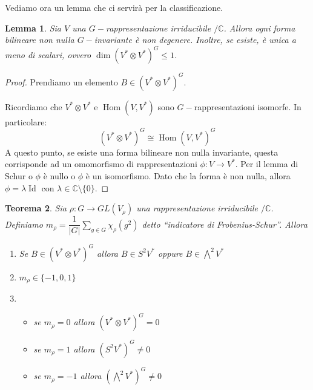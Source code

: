 \documentclass[11pt]{article}
\theoremstyle{plain}
\newtheorem{thm}{Teorema}[section]
\newtheorem{lemma}[thm]{Lemma}
\theoremstyle{definition}
\theoremstyle{remark}
\newcommand{\C}{\mathbb{C}}
\newcommand{\dsum}{\displaystyle\sum}
\DeclareMathOperator{\Hom}{Hom}
\DeclareMathOperator{\Id}{Id}
\begin{document}
Vediamo ora un lemma che ci servirà per la classificazione.
\begin{lemma}
Sia $V$ una $G-$rappresentazione irriducibile $/\C$. Allora ogni forma bilineare non nulla $G-$invariante è non degenere. Inoltre, se esiste, è unica a meno di scalari, ovvero $\dim (V^*\otimes V^*)^G\le1$.
\end{lemma}
\begin{proof}
Prendiamo un elemento $B \in \left( V^* \otimes V^*\right) ^G$.

Ricordiamo che $V^* \otimes V^*$ e $\Hom(V, V^*)$ sono $G-$rappresentazioni isomorfe. In particolare:
\[\left(V^* \otimes V^*\right)^G \cong \Hom(V, V^*)^G \]
A questo punto, se esiste una forma bilineare non nulla invariante, questa corrisponde ad un omomorfismo di rappresentazioni $\phi: V\to V^*$.
Per il lemma di Schur o $\phi$ è nullo o $\phi$ è un isomorfismo. Dato che la forma è non nulla, allora $\phi = \lambda \Id$ con $\lambda \in \C\setminus\{0\}$.
\end{proof}


\begin{thm}
Sia $\rho:G\to GL(V_\rho)$ una rappresentazione irriducibile $/\C$.\\
Definiamo $m_\rho = \dfrac{1}{|G|} \dsum_{g \in G} \chi_{\rho}(g^2)$ detto ``indicatore di Frobenius-Schur''. Allora
\begin{enumerate}
\item Se $B \in (V^* \otimes V^*)^G$ allora $B \in S^2V^*$ oppure $B \in \bigwedge ^2 V^*$
\item  $m_\rho \in \{-1, 0, 1 \}$
\item{ \begin{itemize}
   \item se $m_\rho = 0$ allora $(V^*\otimes V^*)^G = 0$
   \item se $m_\rho = 1$ allora $(S^2 V^*)^G \neq 0$
   \item se $m_\rho = -1$ allora $(\bigwedge^2 V^*)^G \neq 0$
\end{itemize}
}
\end{enumerate}
\end{thm}
\end{document}
